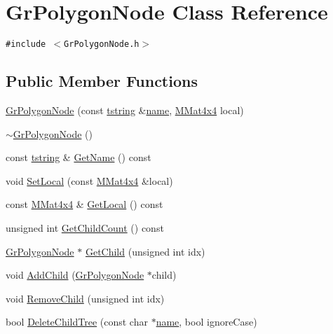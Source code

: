 \hypertarget{class_gr_polygon_node}{
\section{GrPolygonNode Class Reference}
\label{class_gr_polygon_node}
}
{\tt \#include $<$GrPolygonNode.h$>$}

\subsection*{Public Member Functions}
\begin{CompactItemize}
\item 
\hyperlink{class_gr_polygon_node_e8a0d612ed6daab17578b3d097f9f78a}{GrPolygonNode} (const \hyperlink{common__afx_8h_816fa58fd77499b0edb2c69ebe803d5c}{tstring} \&\hyperlink{glext__bak_8h_bb62efe59ccdd153ce42e1a418352209}{name}, \hyperlink{class_m_mat4x4}{MMat4x4} local)
\item 
\hyperlink{class_gr_polygon_node_330ca71f7d551038be453677ef25ac4c}{$\sim$GrPolygonNode} ()
\item 
const \hyperlink{common__afx_8h_816fa58fd77499b0edb2c69ebe803d5c}{tstring} \& \hyperlink{class_gr_polygon_node_716df79755b048ff14d3c1ee293f068e}{GetName} () const 
\item 
void \hyperlink{class_gr_polygon_node_19ee4a38724974d06ee66b619cf0a2e1}{SetLocal} (const \hyperlink{class_m_mat4x4}{MMat4x4} \&local)
\item 
const \hyperlink{class_m_mat4x4}{MMat4x4} \& \hyperlink{class_gr_polygon_node_8d035d5aba6b792c1a43823902922169}{GetLocal} () const 
\item 
unsigned int \hyperlink{class_gr_polygon_node_a03bfe625d9cab1a0ec3ae35bbeb816c}{GetChildCount} () const 
\item 
\hyperlink{class_gr_polygon_node}{GrPolygonNode} $\ast$ \hyperlink{class_gr_polygon_node_80255bc65053efad7bdee15dc46e20b4}{GetChild} (unsigned int idx)
\item 
void \hyperlink{class_gr_polygon_node_40ec07561c3e0e3b60b61b87e3f09250}{AddChild} (\hyperlink{class_gr_polygon_node}{GrPolygonNode} $\ast$child)
\item 
void \hyperlink{class_gr_polygon_node_9970c20562d88e8f9b23a8ce08e3bb24}{RemoveChild} (unsigned int idx)
\item 
bool \hyperlink{class_gr_polygon_node_b7fbedae6034da769fb5bdec3e2da288}{DeleteChildTree} (const char $\ast$\hyperlink{glext__bak_8h_bb62efe59ccdd153ce42e1a418352209}{name}, bool ignoreCase)

\end{CompactItemize}

